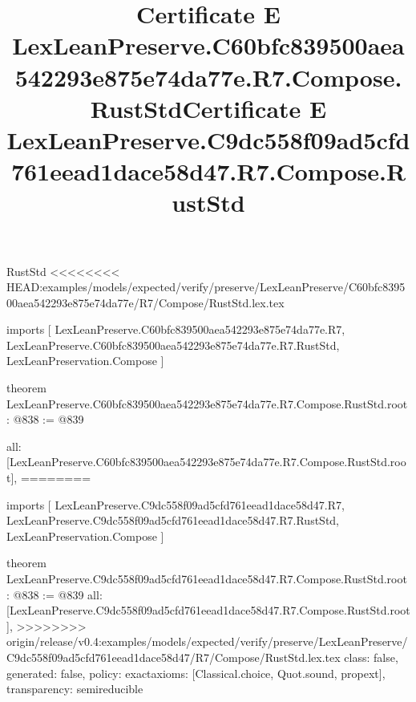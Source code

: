 \begin{lexlean}{RustStd}
<<<<<<<< HEAD:examples/models/expected/verify/preserve/LexLeanPreserve/C60bfc839500aea542293e875e74da77e/R7/Compose/RustStd.lex.tex
\title{Certificate E LexLeanPreserve.C60bfc839500aea542293e875e74da77e.R7.Compose.RustStd}
\begin{coremodule}
imports [
  LexLeanPreserve.C60bfc839500aea542293e875e74da77e.R7,
  LexLeanPreserve.C60bfc839500aea542293e875e74da77e.R7.RustStd,
  LexLeanPreservation.Compose
]

theorem LexLeanPreserve.C60bfc839500aea542293e875e74da77e.R7.Compose.RustStd.root : @838 := @839 {
  all: [LexLeanPreserve.C60bfc839500aea542293e875e74da77e.R7.Compose.RustStd.root],
========
\title{Certificate E LexLeanPreserve.C9dc558f09ad5cfd761eead1dace58d47.R7.Compose.RustStd}
\begin{coremodule}
imports [
  LexLeanPreserve.C9dc558f09ad5cfd761eead1dace58d47.R7,
  LexLeanPreserve.C9dc558f09ad5cfd761eead1dace58d47.R7.RustStd,
  LexLeanPreservation.Compose
]

theorem LexLeanPreserve.C9dc558f09ad5cfd761eead1dace58d47.R7.Compose.RustStd.root : @838 := @839 {
  all: [LexLeanPreserve.C9dc558f09ad5cfd761eead1dace58d47.R7.Compose.RustStd.root],
>>>>>>>> origin/release/v0.4:examples/models/expected/verify/preserve/LexLeanPreserve/C9dc558f09ad5cfd761eead1dace58d47/R7/Compose/RustStd.lex.tex
  class: false,
  generated: false,
  policy: exact{axioms: [Classical.choice, Quot.sound, propext]},
  transparency: semireducible
}


\end{coremodule}}
\end{coremodule}
\end{lexlean}
